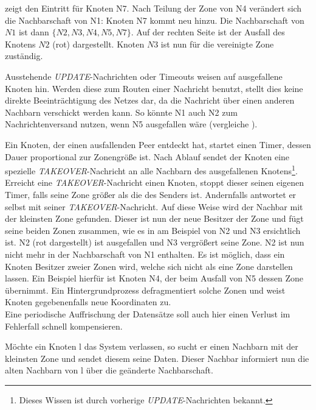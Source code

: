  zeigt den Eintritt für Knoten N7. Nach Teilung der Zone von N4 verändert sich die Nachbarschaft von N1: Knoten N7 kommt neu hinzu. Die Nachbarschaft von $N1$ ist dann $\{N2, N3, N4, N5, N7\}$. Auf der rechten Seite ist der Ausfall des Knotens $N2$ (rot) dargestellt. Knoten $N3$ ist nun für die vereinigte Zone zuständig.

Ausstehende \emph{UPDATE}-Nachrichten oder Timeouts weisen auf ausgefallene Knoten hin. Werden diese zum Routen einer Nachricht benutzt, stellt dies keine direkte Beeinträchtigung des Netzes dar, da die Nachricht über einen anderen Nachbarn verschickt werden kann. So könnte N1 auch N2 zum Nachrichtenversand nutzen, wenn N5 ausgefallen wäre (vergleiche ).

Ein Knoten, der einen ausfallenden Peer entdeckt hat, startet einen Timer, dessen Dauer proportional zur Zonengröße ist. Nach Ablauf sendet der Knoten eine spezielle \emph{TAKEOVER}-Nachricht an alle Nachbarn des ausgefallenen Knotens\footnote{Dieses Wissen ist durch vorherige \emph{UPDATE}-Nachrichten bekannt.}. Erreicht eine \emph{TAKEOVER}-Nachricht einen Knoten, stoppt dieser seinen eigenen Timer, falls seine Zone größer als die des Senders ist. Andernfalls antwortet er selbst mit seiner \emph{TAKEOVER}-Nachricht. Auf diese Weise wird der Nachbar mit der kleinsten Zone gefunden. Dieser ist nun der neue Besitzer der Zone und fügt seine beiden Zonen zusammen, wie es in  am Beispiel von N2 und N3 ersichtlich ist. N2 (rot dargestellt) ist ausgefallen und N3 vergrößert seine Zone. N2 ist nun nicht mehr in der Nachbarschaft von N1 enthalten. Es ist möglich, dass ein Knoten Besitzer zweier Zonen wird, welche sich nicht als eine Zone darstellen lassen. Ein Beispiel hierfür ist Knoten N4, der beim Ausfall von N5 dessen Zone übernimmt. Ein Hintergrundprozess defragmentiert solche Zonen und weist Knoten gegebenenfalls neue Koordinaten zu.\\
Eine periodische Auffrischung der Datensätze soll auch hier einen Verlust im Fehlerfall schnell kompensieren.

Möchte ein Knoten l das System verlassen, so sucht er einen Nachbarn mit der kleinsten Zone und sendet diesem seine Daten. Dieser Nachbar informiert nun die alten Nachbarn von l über die geänderte Nachbarschaft.
